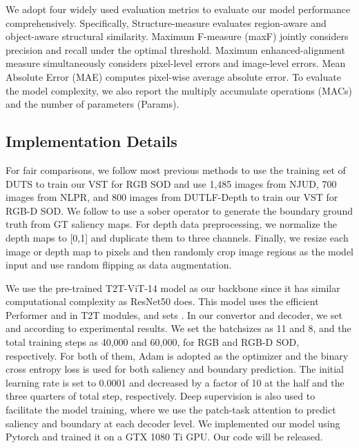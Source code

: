 \documentclass[10pt,twocolumn,letterpaper]{article}
\begin{document}
We adopt four widely used evaluation metrics to evaluate our model performance comprehensively. Specifically, 
Structure-measure  \cite{fan2017structure} evaluates region-aware and object-aware structural similarity. Maximum F-measure (maxF) jointly considers precision and recall under the optimal threshold. Maximum enhanced-alignment measure  \cite{Fan2018Enhanced} simultaneously considers pixel-level errors and image-level errors. Mean Absolute Error (MAE) computes pixel-wise average absolute error. To evaluate the model complexity, we also report the multiply accumulate operations (MACs) and the number of parameters (Params).




\subsection{Implementation Details}
For fair comparisons,
we follow most previous methods to use the training set of DUTS to train our VST for RGB SOD and use 1,485 images from NJUD, 700 images from NLPR, and 800 images from DUTLF-Depth to train our VST for RGB-D SOD.
We follow \cite{zhao2019EGNet} to use a sober operator to generate the boundary ground truth from GT saliency maps.
For depth data preprocessing, we normalize the depth maps to [0,1] and 
duplicate them to three channels.
Finally, we resize each image or depth map to  pixels and then randomly crop  image regions as the model input and use random flipping as data augmentation.

We use the pre-trained T2T-ViT-14 \cite{yuan2021tokens} model as our backbone since it has similar computational complexity as ResNet50 \cite{he2016resnet} does. This model uses the efficient Performer \cite{2020performer} and  in T2T modules, and sets . In our convertor and decoder, we set  and  according to experimental results.
We set the batchsizes as 11 and 8, and the total training steps as 40,000 and 60,000, for RGB and RGB-D SOD, respectively.
For both of them, Adam \cite{Adam2015} is adopted as the optimizer and the binary cross entropy loss is used for both saliency and boundary prediction.
The initial learning rate is set to 0.0001 and decreased by a factor of 10 at the half and the three quarters of total step, respectively.
Deep supervision is also used to facilitate the model training, where we use the patch-task attention to predict saliency and boundary at each decoder level.
We implemented our model using Pytorch \cite{paszke2019pytorch} and trained it on a GTX 1080 Ti GPU. Our code will be released.
\end{document}
